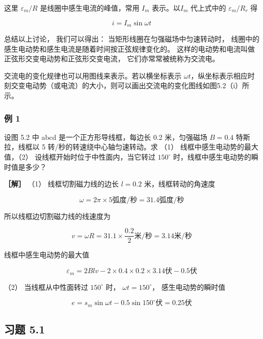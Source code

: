 这里 \(\varepsilon_{m}/R\) 是线圈中感生电流的峰值，常用 \(I_{m}\)
表示。以\(I_{m}\) 代上式中的 \(\varepsilon_{m}/R_{r}\) 得

\[
i = I_{m} \sin \omega t \tag{5.4}
\]

总结以上讨论， 我们可以得出： 当矩形线圈在匀强磁场中匀速转动时，
线圈中的感生电动势和感生电流是随着时间按正弦规律变化的。
这样的电动势和电流叫做正弦形交变电动势和正弦形交变电流，
它们亦常常被统称为交流电。

交流电的变化规律也可以用图线来表示。若以横坐标表示
\(\omega t\)，纵坐标表示相应时刻交变电动势（或电流）的大小，则可以画出交流电的变化图线如图5.2（i）所示。

\subsubsection{例 1}\label{ux4f8b-1-4}

设图 5.2 中 abcd 是一个正方形导线框，每边长 0.2 米，匀强磁场 \(B = 0.4\)
特斯拉，线框以 5 转/秒的转速绕中心轴匀速转动。求 （1）
线框中感生电动势的最大值，（2） 设线框开始时位于中性面内，当它转过
\(150^{\circ}\) 时，线框中感生电动势的瞬时值是多少？

\textbf{［解］} （1） 线框切割磁力线的边长 \(l = 0.2\)
米，线框转动的角速度

\[
\omega = 2 \pi \times 5 \text{弧度/秒} = 31.4 \text{弧度/秒}
\]

所以线框边切割磁力线的线速度为

\[
v = \omega R = 31.1 \times \frac{0.2}{2} \text{米/秒} = 3.14 \text{米/秒}
\]

线框中感生电动势的最大值

\[
\varepsilon_{m} = 2 B l v - 2 \times 0.4 \times 0.2 \times 3.14 \text{伏} - 0.5 \text{伏}
\]

（2） 当线框从中性面转过 \(150^{\circ}\) 时，
\(\omega t = 150^{\circ}\)， 感生电动势的瞬时值

\[
e = s_{m} \sin \omega t - 0.5 \sin 150^{\circ} \text{伏} = 0.25 \text{伏}
\]

\subsection{习题 5.1}\label{ux4e60ux9898-5.1}

